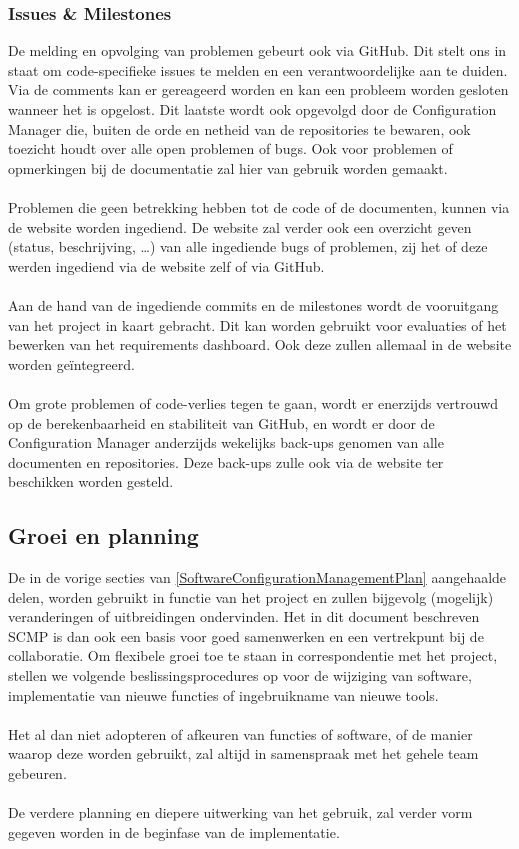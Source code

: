 \subsubsection{Issues \& Milestones}
De melding en opvolging van problemen gebeurt ook via GitHub. Dit stelt ons in staat om code-specifieke issues te melden en een verantwoordelijke aan te duiden. Via de comments kan er gereageerd worden en kan een probleem worden gesloten wanneer het is opgelost. Dit laatste wordt ook opgevolgd door de Configuration Manager die, buiten de orde en netheid van de repositories te bewaren, ook toezicht houdt over alle open problemen of bugs. Ook voor problemen of opmerkingen bij de documentatie zal hier van gebruik worden gemaakt.
\\
\\
Problemen die geen betrekking hebben tot de code of de documenten, kunnen via de website worden ingediend. De website zal verder ook een overzicht geven (status, beschrijving, …) van alle ingediende bugs of problemen, zij het of deze werden ingediend via de website zelf of via GitHub.
\\
\\
Aan de hand van de ingediende commits en de milestones wordt de vooruitgang van het project in kaart gebracht. Dit kan worden gebruikt voor evaluaties of het bewerken van het requirements dashboard. Ook deze zullen allemaal in de website worden geïntegreerd.
\\
\\
Om grote problemen of code-verlies tegen te gaan, wordt er enerzijds vertrouwd op de berekenbaarheid en stabiliteit van GitHub, en wordt er door de Configuration Manager anderzijds wekelijks back-ups genomen van alle documenten en repositories. Deze back-ups zulle ook via de website ter beschikken worden gesteld.

\subsection{Groei en planning}
De in de vorige secties van \ref{SoftwareConfigurationManagementPlan} aangehaalde delen, worden gebruikt in functie van het project en zullen bijgevolg (mogelijk) veranderingen of uitbreidingen ondervinden. Het in dit document beschreven SCMP is dan ook een basis voor goed samenwerken en een vertrekpunt bij de collaboratie. Om flexibele groei toe te staan in correspondentie met het project, stellen we volgende beslissingsprocedures op voor de wijziging van software, implementatie van nieuwe functies of ingebruikname van nieuwe tools.
\\
\\
Het al dan niet adopteren of afkeuren van functies of software, of de manier waarop deze worden gebruikt, zal altijd in samenspraak met het gehele team gebeuren.
\\
\\
De verdere planning en diepere uitwerking van het gebruik, zal verder vorm gegeven worden in de beginfase van de implementatie.

